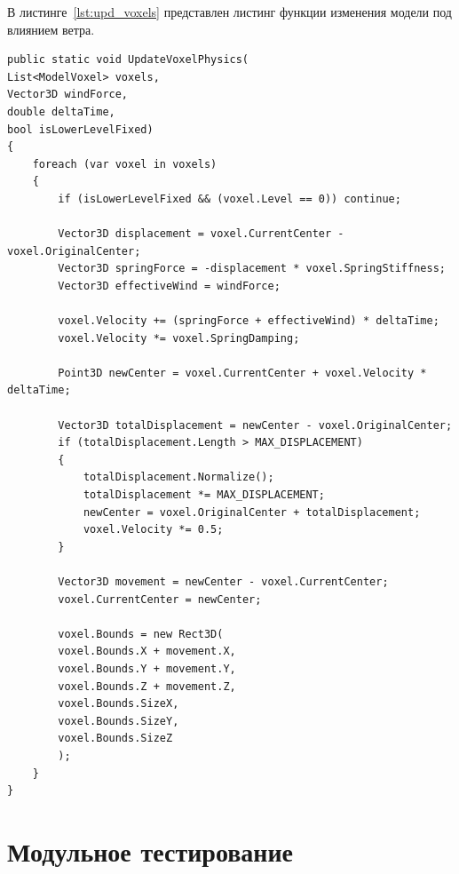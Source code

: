 В листинге~\ref{lst:upd_voxels} представлен листинг функции изменения модели под влиянием ветра.
\newpage
\begin{lstlisting}[style=C, caption={Фунция изменения модели под влиянием ветра},label={lst:upd_voxels}]
public static void UpdateVoxelPhysics(
List<ModelVoxel> voxels,
Vector3D windForce,
double deltaTime,
bool isLowerLevelFixed)
{
	foreach (var voxel in voxels)
	{
		if (isLowerLevelFixed && (voxel.Level == 0)) continue;
		
		Vector3D displacement = voxel.CurrentCenter - voxel.OriginalCenter;
		Vector3D springForce = -displacement * voxel.SpringStiffness;
		Vector3D effectiveWind = windForce;
		
		voxel.Velocity += (springForce + effectiveWind) * deltaTime;
		voxel.Velocity *= voxel.SpringDamping;
		
		Point3D newCenter = voxel.CurrentCenter + voxel.Velocity * deltaTime;
		
		Vector3D totalDisplacement = newCenter - voxel.OriginalCenter;
		if (totalDisplacement.Length > MAX_DISPLACEMENT)
		{
			totalDisplacement.Normalize();
			totalDisplacement *= MAX_DISPLACEMENT;
			newCenter = voxel.OriginalCenter + totalDisplacement;
			voxel.Velocity *= 0.5; 
		}
		
		Vector3D movement = newCenter - voxel.CurrentCenter;
		voxel.CurrentCenter = newCenter;
		
		voxel.Bounds = new Rect3D(
		voxel.Bounds.X + movement.X,
		voxel.Bounds.Y + movement.Y,
		voxel.Bounds.Z + movement.Z,
		voxel.Bounds.SizeX,
		voxel.Bounds.SizeY,
		voxel.Bounds.SizeZ
		);
	}
}
\end{lstlisting}

\section{Модульное тестирование}

